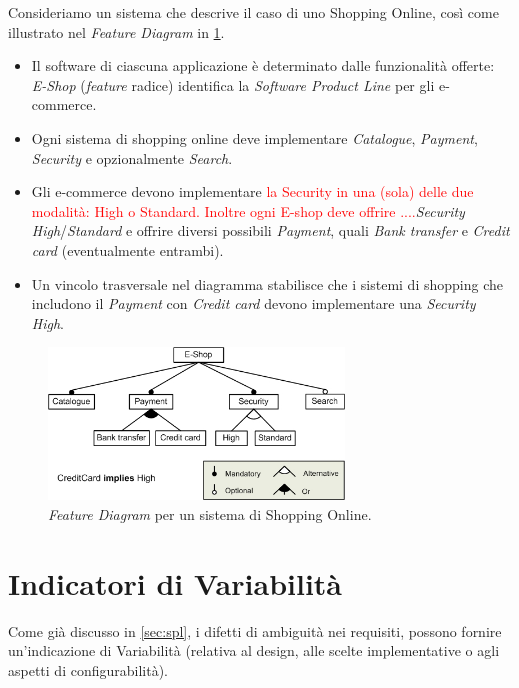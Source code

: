 \documentclass[12pt]{report}
\newcommand{\torevise}[1]{\textcolor{red}{#1}}
\begin{document}
\begin{mdframed}
\small
Consideriamo un sistema che descrive il caso di uno \textsf{Shopping Online}, così come illustrato nel \textit{Feature Diagram} in \cref{fig:diagramma}.

\begin{itemize}
\item Il software di ciascuna applicazione è determinato dalle funzionalità offerte: \textit{E-Shop} (\textit{feature} radice) identifica la \textit{Software Product Line} per gli e-commerce.
\item Ogni sistema di shopping online deve implementare \textit{Catalogue}, \textit{Payment}, \textit{Security} e opzionalmente \textit{Search}.
\item Gli e-commerce devono implementare \torevise{la Security in una (sola) delle due modalità: High o Standard. Inoltre ogni E-shop deve offrire ....}\textit{Security} \textit{High}/\textit{Standard} e offrire diversi possibili \textit{Payment}, quali \textit{Bank transfer} e \textit{Credit card} (eventualmente entrambi).
\item Un vincolo trasversale nel diagramma stabilisce che i sistemi di shopping che includono il \textit{Payment} con \textit{Credit card} devono implementare una \textit{Security} \textit{High}.
\end{itemize}

\begin{figure}[H]
\centering
\includegraphics[width=0.7\textwidth]{diagramma.png}
\caption{\textit{Feature Diagram} per un sistema di Shopping Online.}
\label{fig:diagramma}
\end{figure}
\end{mdframed}


\section{Indicatori di Variabilità}  %
\label{sec:indicatori}
Come già discusso in \cref{sec:spl}, i difetti di ambiguità nei requisiti, possono fornire un'indicazione di Variabilità (relativa al design, alle scelte implementative o agli aspetti di configurabilità).
\end{document}
